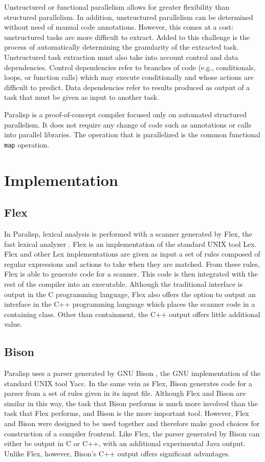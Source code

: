 \documentclass[
abstracton,
fontsize=12pt,
]{scrartcl}
\begin{document}
Unstructured or functional parallelism allows for greater flexibility than structured parallelism. In addition, unstructured parallelism can be determined without need of manual code annotations. However, this comes at a cost: unstructured tasks are more difficult to extract. Added to this challenge is the process of automatically determining the granularity of the extracted task. Unstructured task extraction must also take into account control and data dependencies. Control dependencies refer to branches of code (e.g., conditionals, loops, or function calls) which may execute conditionally and whose actions are difficult to predict. Data dependencies refer to results produced as output of a task that must be given as input to another task.

Paralisp is a proof-of-concept compiler focused only on automated structured parallelism. It does not require any change of code such as annotations or calls into parallel libraries. The operation that is parallelized is the common functional \verb|map| operation.

\section{Implementation}

\subsection{Flex}

In Paralisp, lexical analysis is performed with a scanner generated by Flex, the fast lexical analyzer \autocite{flex}. Flex is an implementation of the standard UNIX tool Lex\@. Flex and other Lex implementations are given as input a set of rules composed of regular expressions and actions to take when they are matched. From these rules, Flex is able to generate code for a scanner. This code is then integrated with the rest of the compiler into an executable. Although the traditional interface is output in the C programming language, Flex also offers the option to output an interface in the C++ programming language which places the scanner code in a containing class. Other than containment, the C++ output offers little additional value.

\subsection{Bison}

Paralisp uses a parser generated by GNU Bison \autocite{bison}, the GNU implementation of the standard UNIX tool Yacc. In the same vein as Flex, Bison generates code for a parser from a set of rules given in its input file. Although Flex and Bison are similar in this way, the task that Bison performs is much more involved than the task that Flex performs, and Bison is the more important tool. However, Flex and Bison were designed to be used together and therefore make good choices for construction of a compiler frontend. Like Flex, the parser generated by Bison can either be output in C or C++, with an additional experimental Java output. Unlike Flex, however, Bison's C++ output offers significant advantages.
\end{document}
